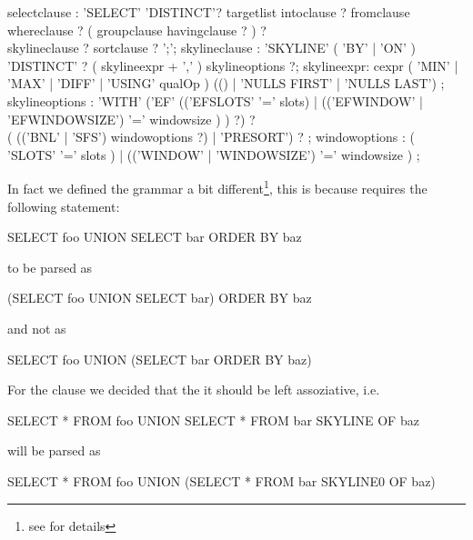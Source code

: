 
\railtermfont{\ttfamily\upshape\tiny}
\railboxheight 12pt
\railinit

\begin{rail}

selectclause : 'SELECT' 'DISTINCT'? targetlist intoclause ? fromclause \\ whereclause ? ( groupclause havingclause ? ) ? \\ skylineclause ? sortclause ? ';';
skylineclause : 'SKYLINE' ( 'BY' | 'ON' ) 'DISTINCT' ? ( skylineexpr + ',' ) skylineoptions ?;
skylineexpr: cexpr ( 'MIN' | 'MAX' | 'DIFF' | 'USING' qualOp ) (() | 'NULLS FIRST' | 'NULLS LAST') ;
skylineoptions : 'WITH' ('EF' (('EFSLOTS' '=' slots) | (('EFWINDOW' | 'EFWINDOWSIZE') '=' windowsize ) ) ?) ? \\ ( (('BNL' | 'SFS') windowoptions ?) | 'PRESORT') ? ;
windowoptions : ( 'SLOTS' '=' slots ) | (('WINDOW' | 'WINDOWSIZE') '=' windowsize ) ;

\end{rail}


In fact we defined the grammar a bit different\footnote{see  for details}, this is because  requires the following statement:
\begin{sql}SELECT foo UNION SELECT bar ORDER BY baz\end{sql}
to be parsed as 
\begin{sql}(SELECT foo UNION SELECT bar) ORDER BY baz\end{sql}
and not as
\begin{sql}SELECT foo UNION (SELECT bar ORDER BY baz)\end{sql}

\noindent{}For the  clause we decided that the it should be left
assoziative, i.e. 
\begin{sql}SELECT * FROM foo UNION SELECT * FROM bar SKYLINE OF baz\end{sql}
will be parsed as 
\begin{sql}SELECT * FROM foo UNION (SELECT * FROM bar SKYLINE0 OF baz)\end{sql}

